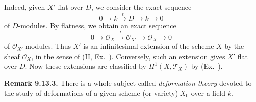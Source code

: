 {Indeed, given $X'$ flat over $D$, we consider the exact sequence
\[
0\longrightarrow k\xrightarrow{t}D\longrightarrow k\longrightarrow0
\]
of $D$-modules. By flatness, we obtain an exact sequence
\[
0\longrightarrow\mathcal O_X\xrightarrow{t}\mathcal O_{X'}\longrightarrow\mathcal O_X\longrightarrow0
\]
of $\mathcal O_{X'}$-modules. Thus $X'$ is an infinitesimal extension of the scheme $X$ by the sheaf $\mathcal O_X$, in the sense of (II, Ex.~). Conversely, such an extension gives $X'$ flat over $D$. Now these extensions are classified by $H^1(X,\mathcal T_X)$ by (Ex.~).

\medskip
\noindent\hypertarget{result-III-9.13.3}{}\textbf{Remark 9.13.3.} There is a whole subject called \emph{deformation theory} devoted to the study of deformations of a given scheme (or variety) $X_0$ over a field $k$.}
